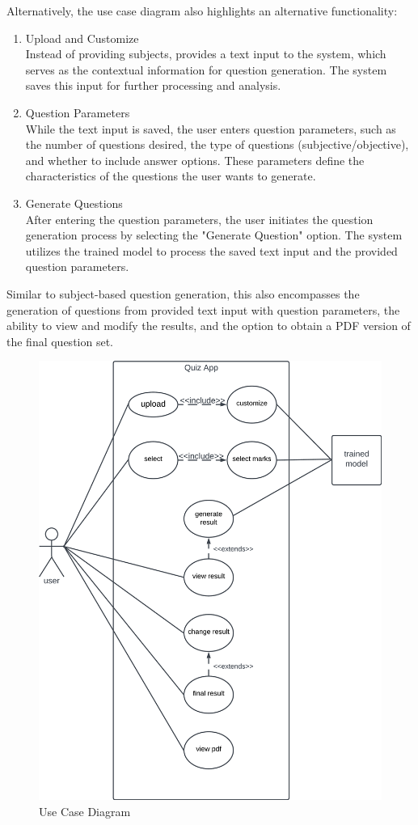 \documentclass[12pt]{report}
\begin{document}
Alternatively, the use case diagram also highlights an alternative functionality:
\begin{enumerate}
    \item Upload and Customize\\
    Instead of providing subjects, provides a text input to the system, which serves as the contextual information for question generation. The system saves this input for further processing and analysis.
    \item Question Parameters\\
    While the text input is saved, the user enters question parameters, such as the number of questions desired, the type of questions (subjective/objective), and whether to include answer options. These parameters define the characteristics of the questions the user wants to generate.
    \item Generate Questions\\
    After entering the question parameters, the user initiates the question generation process by selecting the "Generate Question" option. The system utilizes the trained model to process the saved text input and the provided question parameters.
\end{enumerate}

Similar to subject-based question generation, this also encompasses the generation of questions from provided text input with question parameters, the ability to view and modify the results, and the option to obtain a PDF version of the final question set.
\begin{figure}[ht!]
    \centering
    \includegraphics[scale = 0.9]{Images/UCD.png}
    \caption{Use Case Diagram}
\end{figure}
\pagebreak
\end{document}
